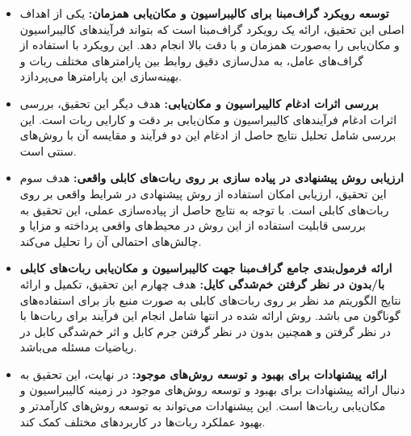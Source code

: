 \begin{itemize}
	\item \textbf{توسعه رویکرد گراف‌مبنا برای کالیبراسیون و مکان‌یابی همزمان:} یکی از اهداف اصلی این تحقیق، ارائه یک رویکرد گراف‌مبنا است که بتواند فرآیندهای کالیبراسیون و مکان‌یابی را به‌صورت همزمان و با دقت بالا انجام دهد. این رویکرد با استفاده از گراف‌های عامل، به مدل‌سازی دقیق روابط بین پارامترهای مختلف ربات و بهینه‌سازی این پارامترها می‌پردازد.
	
	\item \textbf{بررسی اثرات ادغام کالیبراسیون و مکان‌یابی:} هدف دیگر این تحقیق، بررسی اثرات ادغام فرآیندهای کالیبراسیون و مکان‌یابی بر دقت و کارایی ربات است. این بررسی شامل تحلیل نتایج حاصل از ادغام این دو فرآیند و مقایسه آن با روش‌های سنتی است.
	
	\item \textbf{ارزیابی روش پیشنهادی در پیاده سازی بر روی ربات‌های کابلی واقعی:} هدف سوم این تحقیق، ارزیابی امکان استفاده از روش پیشنهادی در شرایط واقعی بر  روی ربات‌های کابلی است. با توجه به نتایج حاصل از پیاده‌سازی عملی، این تحقیق به بررسی قابلیت استفاده از این روش در محیط‌های واقعی پرداخته و مزایا و چالش‌های احتمالی آن را تحلیل می‌کند.
	
	\item \textbf{ارائه فرمول‌بندی جامع  گراف‌مبنا جهت کالیبراسیون و مکان‌یابی ربات‌های کابلی با/بدون در نظر گرفتن خم‌شدگی کایل:} هدف چهارم این تحقیق، تکمیل و ارائه نتایج الگوریتم مد نظر بر روی ربات‌های کابلی به صورت منبع باز برای استفاده‌های گوناگون می ‌باشد. روش ارائه شده در انتها شامل انجام این فرآیند برای ربات‌ها با در نظر گرفتن و همچنین بدون در نظر گرفتن جرم کابل و اثر خم‌شدگی کابل در ریاضیات مسئله می‌باشد.
	
	\item \textbf{ارائه پیشنهادات برای بهبود و توسعه روش‌های موجود:} در نهایت، این تحقیق به دنبال ارائه پیشنهادات برای بهبود و توسعه روش‌های موجود در زمینه کالیبراسیون و مکان‌یابی ربات‌ها است. این پیشنهادات می‌تواند به توسعه روش‌های کارآمدتر و بهبود عملکرد ربات‌ها در کاربردهای مختلف کمک کند.
\end{itemize}




